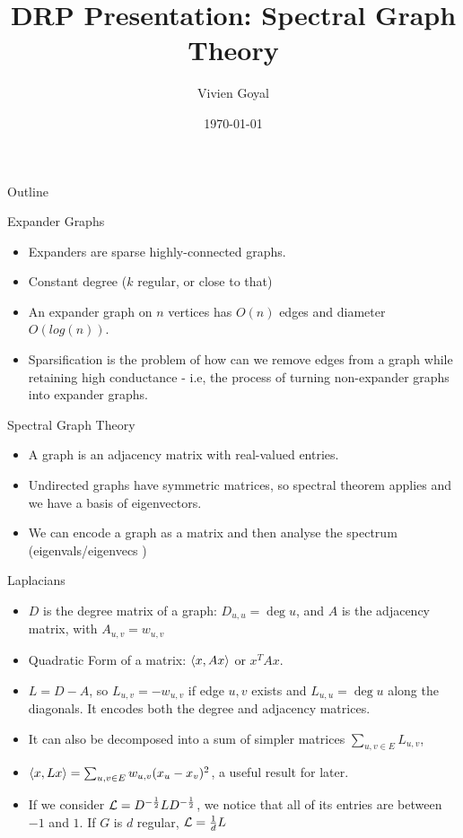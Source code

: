 \documentclass[presentation]{beamer}
\author{Vivien Goyal}
\date{\today}
\title{DRP Presentation: Spectral Graph Theory}
\begin{document}
\maketitle
\begin{frame}{Outline}
\tableofcontents
\end{frame}

\begin{frame}[label={sec:orgc4d91b3}]{Expander Graphs}
\begin{itemize}
\item Expanders are sparse highly-connected graphs.
\item Constant degree (\(k\) regular, or close to that)
\item An expander graph on \(n\) vertices has \(O(n)\) edges and diameter \(O(log(n))\).
\item Sparsification is the problem of how can we remove edges from a graph while retaining high conductance - i.e, the process of turning non-expander graphs into expander graphs.
\end{itemize}
\end{frame}
\begin{frame}[label={sec:orgc718c50}]{Spectral Graph Theory}
\begin{itemize}
\item A graph is an adjacency matrix with real-valued entries.
\item Undirected graphs have symmetric matrices, so spectral theorem applies and we have a basis of eigenvectors.
\item We can encode a graph as a matrix and then analyse the spectrum (eigenvals/eigenvecs )
\end{itemize}
\end{frame}
\begin{frame}[label={sec:orgab9766d}]{Laplacians}
\begin{itemize}
\item \(D\) is the degree matrix of a graph: \(D_{u,u}= \deg u\), and \(A\) is the adjacency matrix, with \(A_{u,v}=w_{u,v}\)
\item Quadratic Form of a matrix: \(\langle x , Ax \rangle\) or \(x^TAx\).
\item \(L=D-A\), so \(L_{u,v}=-w_{u,v}\) if edge \(u,v\) exists and \(L_{u,u}=\deg u\)  along the diagonals. It encodes both the degree and adjacency matrices.
\item It can also be decomposed into a sum of simpler matrices  \(\sum_{u,v \in E}L_{u,v}\),
\item \(\langle x , Lx \rangle=\sum_{u,v \in E} w_{u,v}(x_u-x_v)^2\), a useful result for later.
\item If we consider \(\mathcal{L} = D^{-\frac12}LD^{-\frac12}\), we notice that all of its entries are between \(-1\) and \(1\). If \(G\) is \(d\) regular, \(\mathcal{L}=\frac{1}{d}L\)
\end{itemize}
\end{frame}
\end{document}

